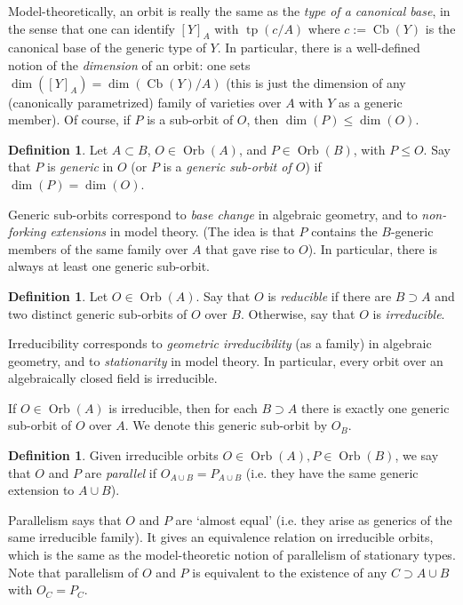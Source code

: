 \documentclass{amsart}
\theoremstyle{definition}
\newtheorem{definition}[theorem]{Definition}
\newcommand{\tp}{\operatorname{tp}}
\begin{document}
Model-theoretically, an orbit is really the same as the \textit{type of a canonical base}, in the sense that one can identify $[Y]_A$ with $\tp(c/A)$ where $c:=\operatorname{Cb}(Y)$ is the canonical base of the generic type of $Y$. In particular, there is a well-defined notion of the \textit{dimension} of an orbit: one sets $\dim([Y]_A)=\dim(\operatorname{Cb}(Y)/A)$ (this is just the dimension of any (canonically parametrized) family of varieties over $A$ with $Y$ as a generic member). Of course, if $P$ is a sub-orbit of $O$, then $\dim(P)\leq\dim(O)$.

\begin{definition}
    Let $A\subset B$, $O\in\operatorname{Orb}(A)$, and $P\in\operatorname{Orb}(B)$, with $P\leq O$. Say that $P$ is \textit{generic} in $O$ (or $P$ is a \textit{generic sub-orbit of $O$}) if $\dim(P)=\dim(O)$.
\end{definition}

Generic sub-orbits correspond to \textit{base change} in algebraic geometry, and to \textit{non-forking extensions} in model theory. (The idea is that $P$ contains the $B$-generic members of the same family over $A$ that gave rise to $O$). In particular, there is always at least one generic sub-orbit.

\begin{definition}
    Let $O\in\operatorname{Orb}(A)$. Say that $O$ is \textit{reducible} if there are $B\supset A$ and two distinct generic sub-orbits of $O$ over $B$. Otherwise, say that $O$ is \textit{irreducible}.
\end{definition}

Irreducibility corresponds to \textit{geometric irreducibility} (as a family) in algebraic geometry, and to \textit{stationarity} in model theory. In particular, every orbit over an algebraically closed field is irreducible. 

If $O\in\operatorname{Orb}(A)$ is irreducible, then for each $B\supset A$ there is exactly one generic sub-orbit of $O$ over $A$. We denote this generic sub-orbit by $O_B$.

\begin{definition}
 Given irreducible orbits $O\in\operatorname{Orb}(A),P\in\operatorname{Orb}(B)$, we say that $O$ and $P$ are \textit{parallel} if $O_{A\cup B}=P_{A\cup B}$ (i.e. they have the same generic extension to $A\cup B$).
\end{definition}

Parallelism says that $O$ and $P$ are `almost equal' (i.e. they arise as generics of the same irreducible family). It gives an equivalence relation on irreducible orbits, which is the same as the model-theoretic notion of parallelism of stationary types. Note that parallelism of $O$ and $P$ is equivalent to the existence of any $C\supset A\cup B$ with $O_C=P_C$.
\end{document}
